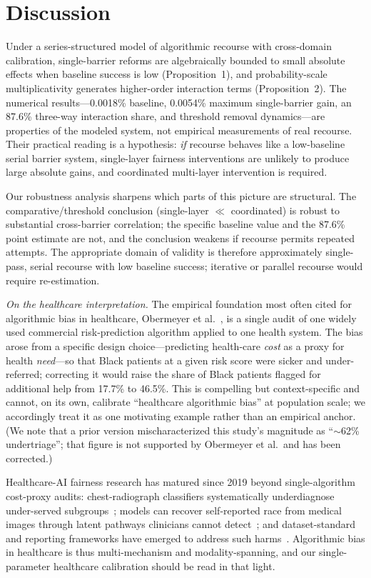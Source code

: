 \documentclass[10pt,letterpaper]{article}
\begin{document}
\section*{Discussion}
Under a series-structured model of algorithmic recourse with cross-domain calibration, single-barrier reforms are algebraically bounded to small absolute effects when baseline success is low (Proposition~1), and probability-scale multiplicativity generates higher-order interaction terms (Proposition~2). The numerical results---0.0018\% baseline, 0.0054\% maximum single-barrier gain, an 87.6\% three-way interaction share, and threshold removal dynamics---are properties of the modeled system, not empirical measurements of real recourse. Their practical reading is a hypothesis: \emph{if} recourse behaves like a low-baseline serial barrier system, single-layer fairness interventions are unlikely to produce large absolute gains, and coordinated multi-layer intervention is required.

Our robustness analysis sharpens which parts of this picture are structural. The comparative/threshold conclusion (single-layer $\ll$ coordinated) is robust to substantial cross-barrier correlation; the specific baseline value and the 87.6\% point estimate are not, and the conclusion weakens if recourse permits repeated attempts. The appropriate domain of validity is therefore approximately single-pass, serial recourse with low baseline success; iterative or parallel recourse would require re-estimation.

\emph{On the healthcare interpretation.} The empirical foundation most often cited for algorithmic bias in healthcare, Obermeyer et al.~\cite{bib_obermeyer}, is a single audit of one widely used commercial risk-prediction algorithm applied to one health system. The bias arose from a specific design choice---predicting health-care \emph{cost} as a proxy for health \emph{need}---so that Black patients at a given risk score were sicker and under-referred; correcting it would raise the share of Black patients flagged for additional help from 17.7\% to 46.5\%. This is compelling but context-specific and cannot, on its own, calibrate ``healthcare algorithmic bias'' at population scale; we accordingly treat it as one motivating example rather than an empirical anchor. (We note that a prior version mischaracterized this study's magnitude as ``$\sim$62\% undertriage''; that figure is not supported by Obermeyer et al.\ and has been corrected.)

Healthcare-AI fairness research has matured since 2019 beyond single-algorithm cost-proxy audits: chest-radiograph classifiers systematically underdiagnose under-served subgroups~\cite{bib_seyyed}; models can recover self-reported race from medical images through latent pathways clinicians cannot detect~\cite{bib_gichoya}; and dataset-standard and reporting frameworks have emerged to address such harms~\cite{bib_arora,bib_alderman,bib_hoche}. Algorithmic bias in healthcare is thus multi-mechanism and modality-spanning, and our single-parameter healthcare calibration should be read in that light.
\end{document}
